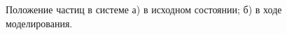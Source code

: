 \documentclass[14pt,a4paper,report]{ncc}
\begin{document}
\begin{figure}[]
\begin{minipage}[]{0.5\linewidth}
\end{minipage}
\hfill
\begin{minipage}[]{0.5\linewidth}
\end{minipage}
\caption{Положение частиц в системе а) в исходном состоянии; б) в ходе моделирования.}
\end{figure}
\end{document}
